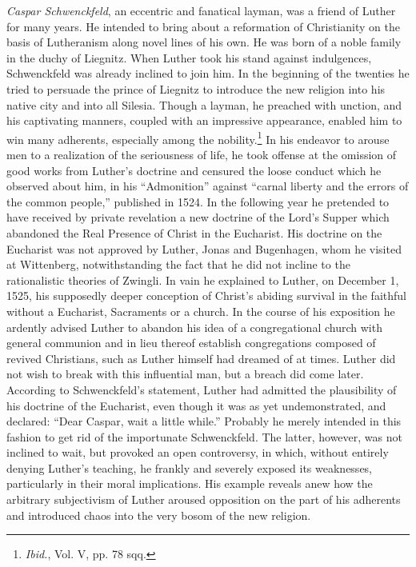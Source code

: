 \textit{Caspar Schwenckfeld}, an eccentric and fanatical layman, was a
friend of Luther for many years. He intended to bring about a reformation
of Christianity on the basis of Lutheranism along novel
lines of his own. He was born of a noble family in the duchy of
Liegnitz. When Luther took his stand against indulgences, Schwenckfeld
was already inclined to join him. In the beginning of the twenties
he tried to persuade the prince of Liegnitz to introduce the new
religion into his native city and into all Silesia. Though a layman, he
preached with unction, and his captivating manners, coupled with
an impressive appearance, enabled him to win many adherents, especially
among the nobility.\footnote{\textit{Ibid.}, Vol. V, pp. 78 sqq.}
In his endeavor to arouse men to a
realization of the seriousness of life, he took offense at the omission of
good works from Luther’s doctrine and censured the loose conduct
which he observed about him, in his “Admonition” against “carnal
liberty and the errors of the common people,” published in 1524. In
the following year he pretended to have received by private revelation
a new doctrine of the Lord’s Supper which abandoned the Real
Presence of Christ in the Eucharist. His doctrine on the Eucharist
was not approved by Luther, Jonas and Bugenhagen, whom he visited
at Wittenberg, notwithstanding the fact that he did not incline to
the rationalistic theories of Zwingli. In vain he explained to Luther,
on December 1, 1525, his supposedly deeper conception of Christ’s
abiding survival in the faithful without a Eucharist, Sacraments or
a church. In the course of his exposition he ardently advised Luther
to abandon his idea of a congregational church with general communion
and in lieu thereof establish congregations composed of revived Christians,
such as Luther himself had dreamed of at times.
Luther did not wish to break with this influential man, but a breach
did come later. According to Schwenckfeld’s statement, Luther had
admitted the plausibility of his doctrine of the Eucharist, even though
it was as yet undemonstrated, and declared: “Dear Caspar, wait a
little while.” Probably he merely intended in this fashion to get rid
of the importunate Schwenckfeld. The latter, however, was not inclined
to wait, but provoked an open controversy, in which, without
entirely denying Luther’s teaching, he frankly and severely exposed
its weaknesses, particularly in their moral implications. His example
reveals anew how the arbitrary subjectivism of Luther aroused opposition
on the part of his adherents and introduced chaos into the very
bosom of the new religion.

